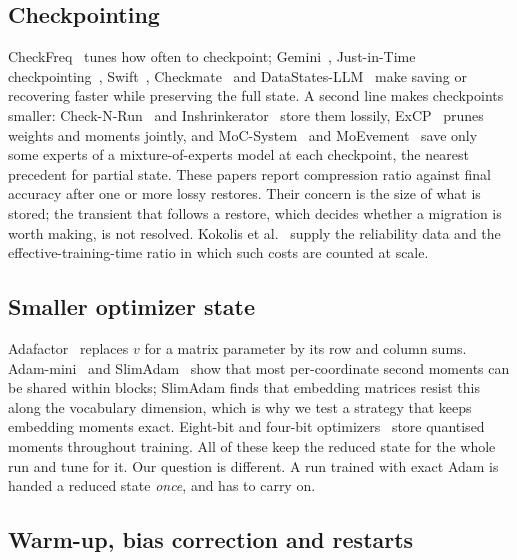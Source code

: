 \subsection{Checkpointing}

CheckFreq~\cite{mohan2021checkfreq} tunes how often to checkpoint; Gemini~\cite{wang2023gemini},
Just-in-Time checkpointing~\cite{gupta2024jit}, Swift~\cite{zhong2024swift}, Checkmate~\cite{bhardwaj2025checkmate} and
DataStates-LLM~\cite{maurya2026datastates} make saving or recovering faster while preserving the full state.
A second line makes checkpoints smaller: Check-N-Run~\cite{eisenman2022checknrun} and
Inshrinkerator~\cite{agrawal2024inshrinkerator} store them lossily, ExCP~\cite{li2024excp} prunes weights and moments
jointly, and MoC-System~\cite{cai2025moc} and MoEvement~\cite{gandhi2026moevement} save only some experts of a
mixture-of-experts model at each checkpoint, the nearest precedent for partial state. These papers report compression
ratio against final accuracy after one or more lossy restores. Their concern is the size of what is stored; the
transient that follows a restore, which decides whether a migration is worth making, is not resolved.
Kokolis et al.~\cite{kokolis2025reliability} supply the reliability data and the effective-training-time ratio in which
such costs are counted at scale.

\subsection{Smaller optimizer state}

Adafactor~\cite{shazeer2018adafactor} replaces $v$ for a matrix parameter by its row and column sums.
Adam-mini~\cite{zhang2025adammini} and SlimAdam~\cite{kalra2025slimadam} show that most per-coordinate second moments
can be shared within blocks; SlimAdam finds that embedding matrices resist this along the vocabulary dimension, which
is why we test a strategy that keeps embedding moments exact. Eight-bit and four-bit
optimizers~\cite{dettmers2022eightbit,li2023fourbit} store quantised moments throughout training. All of these keep the
reduced state for the whole run and tune for it. Our question is different. A run trained with exact Adam is handed
a reduced state \emph{once}, and has to carry on.

\subsection{Warm-up, bias correction and restarts}

